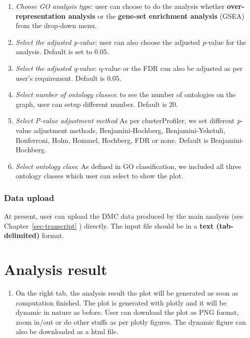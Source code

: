 \documentclass[
  a4paper,
  oneside,
  open=any]{scrreport}
\providecommand{\tightlist}{%
  \setlength{\itemsep}{0pt}\setlength{\parskip}{0pt}}\usepackage{longtable,booktabs,array}
\begin{document}
\begin{enumerate}
\def\labelenumi{\arabic{enumi}.}
\tightlist
\item
  \emph{Choose GO analysis type}: user can choose to do the analysis
  whether \textbf{over-representation analysis} or the \textbf{gene-set
  enrichment analysis} (GSEA) from the drop-down menu.
\item
  \emph{Select the adjusted p-value}: user can also choose the adjusted
  \emph{p}-value for the analysis. Default is set to 0.05.
\item
  \emph{Select the adjusted q-value}: q-value or the FDR can also be
  adjusted as per user's requirement. Default is 0.05.
\item
  \emph{Select number of ontology classes}: to see the number of
  ontologies on the graph, user can setup different number. Default is
  20.
\item
  \emph{Select P-value adjustment method} As per clusterProfiler, we set
  different \emph{p}-value adjustment methods, Benjamini-Hochberg,
  Benjamini-Yeketuli, Bonferroni, Holm, Hommel, Hochberg, FDR or none.
  Default is Benjamini-Hochberg.
\item
  \emph{Select ontology class}: As defined in GO classification, we
  included all three ontology classes which user can select to show the
  plot.
\end{enumerate}

\hypertarget{data-upload-3}{%
\subsubsection{Data upload}\label{data-upload-3}}

At present, user can upload the DMC data produced by the main analysis
(see Chapter~\ref{sec-transcript} ) directly. The input file should be
in a \textbf{text (tab-delimited)} format.

\hypertarget{analysis-result-3}{%
\section{Analysis result}\label{analysis-result-3}}

\begin{enumerate}
\def\labelenumi{\arabic{enumi}.}
\tightlist
\item
  On the right tab, the analysis result the plot will be generated as
  soon as computation finished. The plot is generated with plotly and it
  will be dynamic in nature as before. User can download the plot as PNG
  format, zoom in/out or do other stuffs as per plotly figures. The
  dynamic figure can also be downloaded as a html file.
\end{enumerate}
\end{document}
